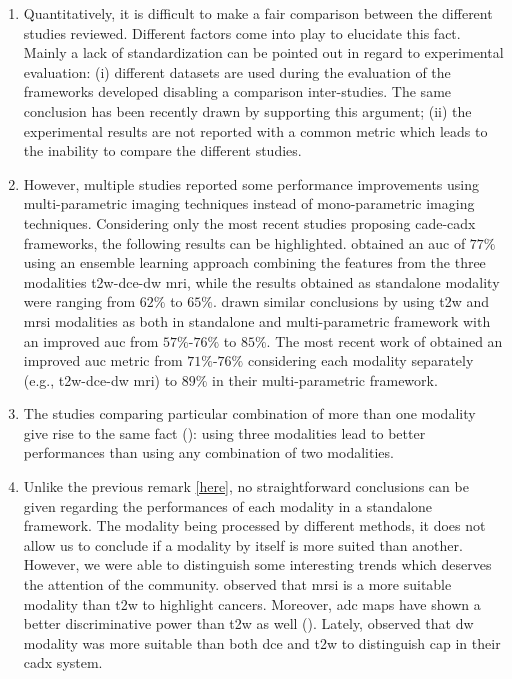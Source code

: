 \begin{enumerate}
\item Quantitatively, it is difficult to make a fair comparison between the different studies reviewed. Different factors come into play to elucidate this fact. Mainly a lack of standardization can be pointed out in regard to experimental evaluation: (i) different datasets are used during the evaluation of the frameworks developed disabling a comparison inter-studies. The same conclusion has been recently drawn by \cite{Litjens2014} supporting this argument; (ii) the experimental results are not reported with a common metric which leads to the inability to compare the different studies.

\item \label{here} However, multiple studies reported some performance improvements using multi-parametric imaging techniques instead of mono-parametric imaging techniques. Considering only the most recent studies proposing \ac{cade}-\ac{cadx} frameworks, the following results can be highlighted. 	
  \cite{Viswanath2011} obtained an \ac{auc} of $77\%$ using an ensemble learning approach combining the features from the three modalities \ac{t2w}-\ac{dce}-\ac{dw} \ac{mri}, while the results obtained as standalone modality were ranging from $62\%$ to $65\%$. 	
  \cite{Tiwari2013} drawn similar conclusions by using \ac{t2w} and \ac{mrsi} modalities as both in standalone and multi-parametric framework with an improved \ac{auc} from $57\%$-$76\%$ to $85\%$. 	
  The most recent work of \cite{Litjens2014} obtained an improved \ac{auc} metric from $71\%$-$76\%$ considering each modality separately (e.g., \ac{t2w}-\ac{dce}-\ac{dw} \ac{mri}) to $89\%$ in their multi-parametric framework.

\item The studies comparing particular combination of more than one modality give rise to the same fact (\cite{Ozer2010,Litjens2011,Liu2013,Litjens2014}): using three modalities lead to better performances than using any combination of two modalities. 

\item Unlike the previous remark \ref{here}, no straightforward conclusions can be given regarding the performances of each modality in a standalone framework. The modality being processed by different methods, it does not allow us to conclude if a modality by itself is more suited than another. However, we were able to distinguish some interesting trends which deserves the attention of the community. \cite{Tiwari2009a,Tiwari2012,Tiwari2013} observed that \ac{mrsi} is a more suitable modality than \ac{t2w} to highlight cancers. Moreover, \ac{adc} maps have shown a better discriminative power than \ac{t2w} as well (\cite{Langer2009,Viswanath2011,Peng2013}). Lately, \cite{Litjens2014} observed that \ac{dw} modality was more suitable than both \ac{dce} and \ac{t2w} to distinguish \ac{cap} in their \ac{cadx} system. 


\end{enumerate}
